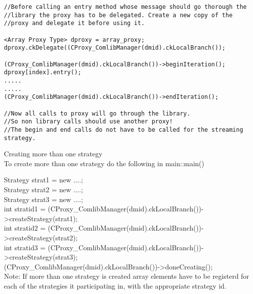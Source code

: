 \begin{enumerate}
\begin{verbatim}
//Before calling an entry method whose message should go thorough the
//library the proxy has to be delegated. Create a new copy of the
//proxy and delegate it before using it.

<Array Proxy Type> dproxy = array_proxy;
dproxy.ckDelegate((CProxy_ComlibManager(dmid).ckLocalBranch());

(CProxy_ComlibManager(dmid).ckLocalBranch())->beginIteration();
dproxy[index].entry();
.....
.....
(CProxy_ComlibManager(dmid).ckLocalBranch())->endIteration();

//Now all calls to proxy will go through the library.
//So non library calls should use another proxy!
//The begin and end calls do not have to be called for the streaming strategy.
\end{verbatim}
\end{enumerate}

Creating more than one strategy \\
To create more than one strategy do the following in main::main()

Strategy strat1 = new ....; \\
Strategy strat2 = new ....; \\
Strategy strat3 = new ....; \\

int stratid1 = (CProxy\_ComlibManager(dmid).ckLocalBranch())->createStrategy(strat1); \\
int stratid2 = (CProxy\_ComlibManager(dmid).ckLocalBranch())->createStrategy(strat2); \\
int stratid3 = (CProxy\_ComlibManager(dmid).ckLocalBranch())->createStrategy(strat3); \\

(CProxy\_ComlibManager(dmid).ckLocalBranch())->doneCreating(); \\

Note: If more than one strategy is created array elements have to be
registerd for each of the strategies it participating in, with the
appropriate strategy id.
